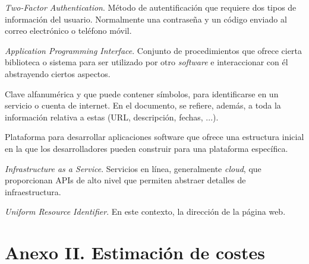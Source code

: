 \documentclass{article}
\begin{document}
\begin{description}
    \setlength\itemsep{0em}
    \item[2FA] \textit{Two-Factor Authentication}. Método de autentificación que requiere dos tipos de información del usuario. Normalmente una contraseña y un código enviado al correo electrónico o teléfono móvil.
    \item[API] \textit{Application Programming Interface}. Conjunto de procedimientos que ofrece cierta biblioteca o sistema para ser utilizado por otro \textit{software} e interaccionar con él abstrayendo ciertos aspectos.
    \item[Contraseña] Clave alfanumérica y que puede contener símbolos, para identificarse en un servicio o cuenta de internet. En el documento, se refiere, además, a toda la información relativa a estas (URL, descripción, fechas, ...).
    \item[Framework] Plataforma para desarrollar aplicaciones software que ofrece una estructura inicial en la que los desarrolladores pueden construir para una plataforma específica. 
    \item[IaaS] \textit{Infrastructure as a Service}. Servicios en línea, generalmente \textit{cloud}, que proporcionan APIs de alto nivel que permiten abstraer detalles de infraestructura.
    \item[URL] \textit{Uniform Resource Identifier}. En este contexto, la dirección de la página web. 
\end{description}

\section*{Anexo II. Estimación de costes}

\end{document}
